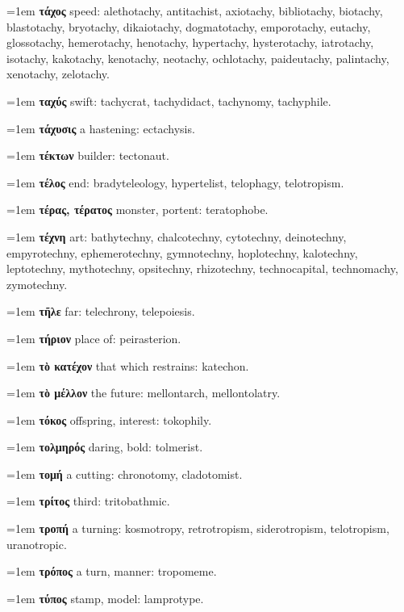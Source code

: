 \hangindent=1em \textbf{τάχος} speed: alethotachy, antitachist, axiotachy, bibliotachy, biotachy, blastotachy, bryotachy, dikaiotachy, dogmatotachy, emporotachy, eutachy, glossotachy, hemerotachy, henotachy, hypertachy, hysterotachy, iatrotachy, isotachy, kakotachy, kenotachy, neotachy, ochlotachy, paideutachy, palintachy, xenotachy, zelotachy.\par
\hangindent=1em \textbf{ταχύς} swift: tachycrat, tachydidact, tachynomy, tachyphile.\par
\hangindent=1em \textbf{τάχυσις} a hastening: ectachysis.\par
\hangindent=1em \textbf{τέκτων} builder: tectonaut.\par
\hangindent=1em \textbf{τέλος} end: bradyteleology, hypertelist, telophagy, telotropism.\par
\hangindent=1em \textbf{τέρας, τέρατος} monster, portent: teratophobe.\par
\hangindent=1em \textbf{τέχνη} art: bathytechny, chalcotechny, cytotechny, deinotechny, empyrotechny, ephemerotechny, gymnotechny, hoplotechny, kalotechny, leptotechny, mythotechny, opsitechny, rhizotechny, technocapital, technomachy, zymotechny.\par
\hangindent=1em \textbf{τῆλε} far: telechrony, telepoiesis.\par
\hangindent=1em \textbf{τήριον} place of: peirasterion.\par
\hangindent=1em \textbf{τὸ κατέχον} that which restrains: katechon.\par
\hangindent=1em \textbf{τὸ μέλλον} the future: mellontarch, mellontolatry.\par
\hangindent=1em \textbf{τόκος} offspring, interest: tokophily.\par
\hangindent=1em \textbf{τολμηρός} daring, bold: tolmerist.\par
\hangindent=1em \textbf{τομή} a cutting: chronotomy, cladotomist.\par
\hangindent=1em \textbf{τρίτος} third: tritobathmic.\par
\hangindent=1em \textbf{τροπή} a turning: kosmotropy, retrotropism, siderotropism, telotropism, uranotropic.\par
\hangindent=1em \textbf{τρόπος} a turn, manner: tropomeme.\par
\hangindent=1em \textbf{τύπος} stamp, model: lamprotype.\par
